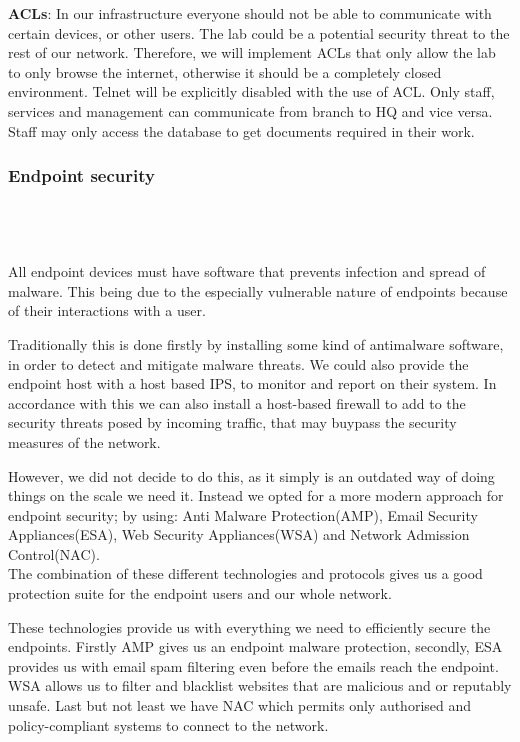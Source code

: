 \textbf{ACLs}: In our infrastructure everyone should not be able to communicate with certain devices, or other users. The lab could be a potential security threat to the rest of our network. Therefore, we will implement ACLs that only allow the lab to only browse the internet, otherwise it should be a completely closed environment. Telnet will be explicitly disabled with the use of ACL. Only staff, services and management can communicate from branch to HQ and vice versa. Staff may only access the database to get documents required in their work.

\subsubsection{Endpoint security}

\\
\\
\\
All endpoint devices must have software that prevents infection and spread of malware. This being due to the especially vulnerable nature of endpoints because of their interactions with a user.

Traditionally this is done firstly by installing some kind of antimalware software, in order to detect and mitigate malware threats. We could also provide the endpoint host with a host based IPS, to monitor and report on their system.
In accordance with this we can also install a host-based firewall to add to the security threats posed by incoming traffic, that may buypass the security measures of the network.

However, we did not decide to do this, as it simply is an outdated way of doing things on the scale we need it. Instead we opted for a more modern approach for endpoint security; by using:
Anti Malware Protection(AMP),
Email Security Appliances(ESA),
Web Security Appliances(WSA) 
and Network Admission Control(NAC).
\\The combination of these different technologies and protocols gives us a good protection suite for the endpoint users and our whole network.

These technologies provide us with everything we need to efficiently secure the endpoints. Firstly AMP gives us an endpoint malware protection, secondly, ESA provides us with email spam filtering even before the emails reach the endpoint.
\\ WSA allows us to filter and blacklist websites that are malicious and or reputably unsafe. Last but not least we have NAC which permits only authorised and policy-compliant systems to connect to the network.

